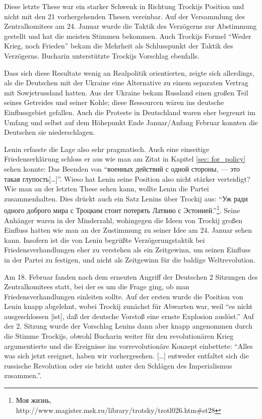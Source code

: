 \documentclass[12pt,headsepline,a4paper]{scrartcl}
\newcommand\textcyr[1]{{\fontencoding{OT2}\fontfamily{wncyr}\selectfont #1}}
\begin{document}
Diese letzte These war ein starker Schwenk in Richtung Trockijs Position und nicht mit den 21 vorhergehenden Thesen vereinbar. Auf der Versammlung des Zentralkomitees am 24. Januar wurde die Taktik des Verzögerns zur Abstimmung gestellt und hat die meisten Stimmen bekommen. Auch Trockijs Formel "`Weder Krieg, noch Frieden"' bekam die Mehrheit als Schlusspunkt der Taktik des Verzögerns.\autocite[114]{baum1969} Bucharin unterstützte Trockijs Vorschlag ebenfalls.

Dass sich diese Resultate wenig an Realpolitik orientierten, zeigte sich allerdings, als die Deutschen mit der Ukraine eine Alternative zu einem separaten Vertrag mit Sowjetrussland hatten. Aus der Ukraine bekam Russland einen großen Teil seines Getreides und seiner Kohle; diese Ressourcen wären ins deutsche Einflussgebiet gefallen. Auch die Proteste in Deutschland waren eher begrenzt im Umfang und selbst auf dem Höhepunkt Ende Januar/Anfang Februar konnten die Deutschen sie niederschlagen.

Lenin erfasste die Lage also sehr pragmatisch. Auch eine einseitige Friedenserklärung schloss er aus wie man am Zitat in Kapitel \ref{sec: for_policy} sehen konnte: Das Beenden von "`\textcyr{[\ldots] военных действий с одной стороны, — это такая глупость[\ldots]}"'. Wieso hat Lenin seine Position also nicht stärker verteidigt? Wie man an der letzten These sehen kann, wollte Lenin die Partei zusammenhalten. Dies drückt auch ein Satz Lenins über Trockij aus: "`\textcyr{Уж ради одного доброго мира с Троцким стоит потерять Латвию с Эстонией.}"'\footnote{\textcyr{Моя жизнь,} http://www.magister.msk.ru/library/trotsky/trotl026.htm\#st28}. Seine Anhänger waren in der Minderzahl, wohingegen die Ideen von Trockij großen Einfluss hatten wie man an der Zustimmung zu seiner Idee am 24. Januar sehen kann. Insofern ist die von Lenin begrüßte Verzögerungstaktik bei Friedensverhandlungen eher zu verstehen als ein Zeitgewinn, um seinen Einfluss in der Partei zu festigen, und nicht als Zeitgewinn für die baldige Weltrevolution\autocite[106]{fels2012}.

Am 18. Februar fanden nach dem erneuten Angriff der Deutschen 2 Sitzungen des Zentralkomitees statt, bei der es um die Frage ging, ob man Friedensverhandlungen einleiten sollte.
Auf der ersten wurde die Position von Lenin knapp abgelehnt, wobei Trockij zunächst für Abwarten war, weil "`es nicht ausgeschlossen [ist], daß der deutsche Vorstoß eine ernste Explosion auslöst."'\autocite[117]{baum1969}
Auf der 2. Sitzung wurde der Vorschlag Lenins dann aber knapp angenommen durch die Stimme Trockijs, obwohl Bucharin weiter für den revolutionären Krieg argumentierte und die Ereignisse ins vorrevolutionäre Konzept einbettete: "`Alles was sich jetzt ereignet, haben wir vorhergesehen. [\ldots] entweder entfaltet sich die russische Revolution oder sie bricht unter den Schlägen des Imperialismus zusammen."'\autocite[119--120]{baum1969}.
\end{document}
